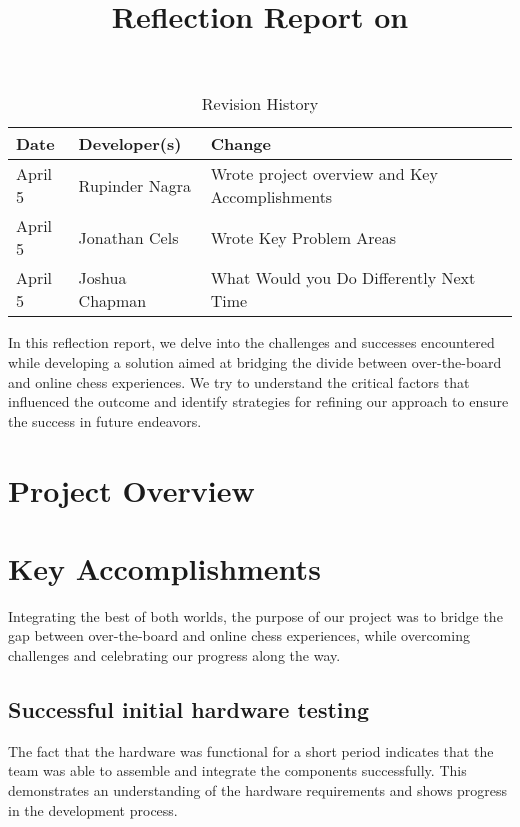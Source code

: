 \documentclass{article}
\title{Reflection Report on \progname}
\author{\authname}
\date{}
\begin{document}
\begin{table}[hp]
\caption{Revision History} \label{TblRevisionHistory}
\begin{tabularx}{\textwidth}{llX}
\toprule
\textbf{Date} & \textbf{Developer(s)} & \textbf{Change}\\
\midrule
April 5 & Rupinder Nagra & Wrote project overview and Key Accomplishments\\
April 5 & Jonathan Cels & Wrote Key Problem Areas\\
April 5 & Joshua Chapman & What Would you Do Differently Next Time\\
\bottomrule
\end{tabularx}
\end{table}

\newpage

\maketitle

In this reflection report, we delve into the challenges and successes encountered while developing a solution aimed at bridging the divide between over-the-board and online chess experiences. We try to understand the critical factors that influenced the outcome and identify strategies for refining our approach to ensure the success in future endeavors.

\section{Project Overview}
\projectoverview

\section{Key Accomplishments}

Integrating the best of both worlds, the purpose of our project was to bridge the gap between over-the-board and online chess experiences, while overcoming challenges and celebrating our progress along the way.

\subsection{Successful initial hardware testing}
The fact that the hardware was functional for a short period indicates that the team was able to assemble and integrate the components successfully. This demonstrates an understanding of the hardware requirements and shows progress in the development process.
\end{document}

